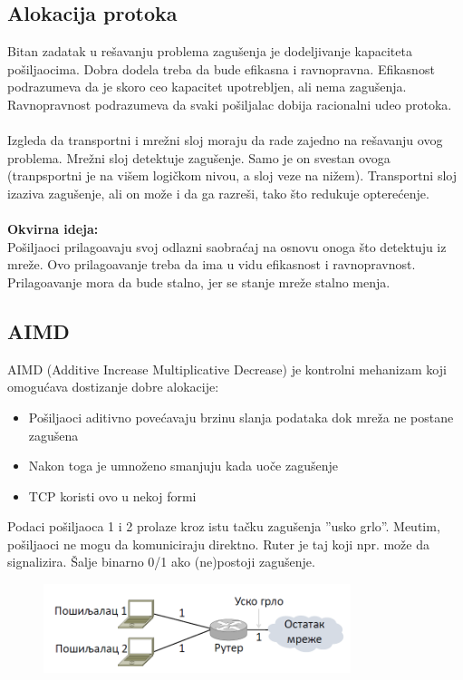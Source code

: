 \documentclass{article} %
\begin{document}
\subsection{Alokacija protoka}

\noindent Bitan zadatak u re\v savanju problema zagu\v senja je dodeljivanje kapaciteta po\v siljaocima. Dobra dodela treba da bude efikasna i ravnopravna. Efikasnost podrazumeva da je skoro ceo kapacitet upotrebljen, ali nema zagu\v senja. Ravnopravnost podrazumeva da svaki po\v siljalac dobija racionalni udeo protoka.
\\
\\ Izgleda da transportni i mre\v zni sloj moraju da rade zajedno na re\v savanju ovog problema. Mre\v zni sloj detektuje zagu\v senje. Samo je on svestan ovoga (tranpsportni je na vi\v sem logi\v ckom nivou, a sloj veze na ni\v zem). Transportni sloj izaziva zagu\v senje, ali on mo\v ze i da ga razre\v si, tako \v sto redukuje optere\' cenje.
\\
\\ \textbf{Okvirna ideja:}
\\ Po\v siljaoci prilago\dj avaju svoj odlazni saobra\' caj na osnovu onoga \v sto detektuju iz mre\v ze. Ovo prilago\dj avanje treba da ima u vidu efikasnost i ravnopravnost. Prilago\dj avanje mora da bude stalno, jer se stanje mre\v ze stalno menja.

\subsection{AIMD}

\noindent AIMD (Additive Increase Multiplicative Decrease) je kontrolni mehanizam koji omogu\' cava dostizanje dobre alokacije:
\begin{itemize}
	\item Po\v siljaoci aditivno pove\' cavaju brzinu slanja podataka dok mre\v za ne postane zagu\v sena
	\item Nakon toga je umno\v zeno smanjuju kada uo\v ce zagu\v senje
	\item TCP koristi ovo u nekoj formi
\end{itemize}

\noindent Podaci po\v siljaoca 1 i 2 prolaze kroz istu ta\v cku zagu\v senja ''usko grlo''. Me\dj utim, po\v siljaoci ne mogu da komuniciraju direktno. Ruter je taj koji npr. mo\v ze da signalizira. \v Salje binarno 0/1 ako (ne)postoji zagu\v senje.

\begin{figure}[H]
	\centering
	\includegraphics[width=0.8\textwidth]{tcp/usko-grlo.png}
\end{figure}
\end{document}
